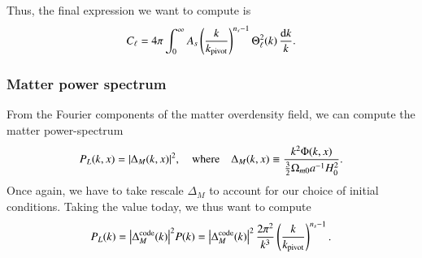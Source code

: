Thus, the final expression we want to compute is 
\begin{equation}
    C_\ell = 4\pi \int_0^\infty A_s \left( \frac{k}{k_\mathrm{pivot}} \right)^{n_s-1} \Theta_\ell^2(k) \, \frac{\dd k}{k}.
\end{equation}

\subsubsection{Matter power spectrum} \label{sssec:M4:theory:matter_power_spectrum}
From the Fourier components of the matter overdensity field, we can compute the matter power-spectrum
\begin{equation}
    P_L(k,x) = \abs{\Delta_M(k,x)}^2,\quad \text{where}\quad \Delta_M(k,x) \equiv \frac{k^2 \Phi(k,x)}{\frac{3}{2}\Omega_{m0} a^{-1} H_0^2}.
\end{equation}
Once again, we have to take rescale $\Delta_M$ to account for our choice of initial conditions. Taking the value today, we thus want to compute 
\begin{equation}
    P_L(k) = \abs{\Delta_M^\mathrm{code}(k)}^2 P(k) = \abs{\Delta_M^\mathrm{code}(k)}^2\, \frac{2\pi^2}{k^3}\left( \frac{k}{k_\mathrm{pivot}} \right)^{n_s-1}.
\end{equation}